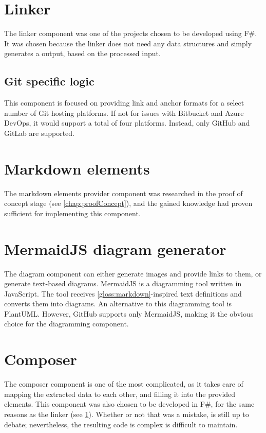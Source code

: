 \section{Linker} \label{sec:linker}

The linker component was one of the projects chosen to be developed using F\#. It was chosen because the linker does not need any data structures and simply generates a output, based on the processed input.

\subsection{Git specific logic}

This component is focused on providing link and anchor formats for a select number of Git hosting platforms. If not for issues with Bitbucket and Azure DevOps, it would support a total of four platforms. Instead, only GitHub and GitLab are supported.

\section{Markdown elements}

The markdown elements provider component was researched in the proof of concept stage (see \ref{chap:proofConcept}), and the gained knowledge had proven sufficient for implementing this component.

\section{MermaidJS diagram generator}

The diagram component can either generate images and provide links to them, or generate text-based diagrams. MermaidJS is a diagramming tool written in JavaScript. The tool receives \ref{gloss:markdown}-inspired text definitions and converts them into diagrams. An alternative to this diagramming tool is PlantUML. However, GitHub supports only MermaidJS, making it the obvious choice for the diagramming component.

\section{Composer}

The composer component is one of the most complicated, as it takes care of mapping the extracted data to each other, and filling it into the provided elements. This component was also chosen to be developed in F\#, for the same reasons as the linker (see \ref{sec:linker}). Whether or not that was a mistake, is still up to debate; nevertheless, the resulting code is complex is difficult to maintain.

